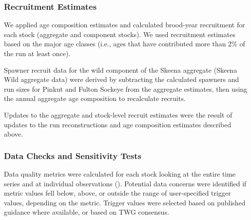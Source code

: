 \documentclass[french,11pt]{book}
\begin{document}
\subsubsection{Recruitment Estimates}\label{recruitment-estimates}

We applied age composition estimates and calculated brood-year recruitment for each stock (aggregate and component stocks). We used recruitment estimates based on the major age classes (i.e., ages that have contributed more than 2\% of the run at least once).

Spawner recruit data for the wild component of the Skeena aggregate (Skeena Wild aggregate data) were derived by subtracting the calculated spawners and run sizes for Pinkut and Fulton Sockeye from the aggregate estimates, then using the annual aggregate age composition to recalculate recruits.

Updates to the aggregate and stock-level recruit estimates were the result of updates to the run reconstructions and age composition estimates described above.

\subsubsection{Data Checks and Sensitivity Tests}\label{data-checks-and-sensitivity-tests}

Data quality metrics were calculated for each stock looking at the entire time series and at individual observations (). Potential data concerns were identified if metric values fell below, above, or outside the range of user-specified trigger values, depending on the metric. Trigger values were selected based on published guidance where available, or based on TWG consensus.
\end{document}
